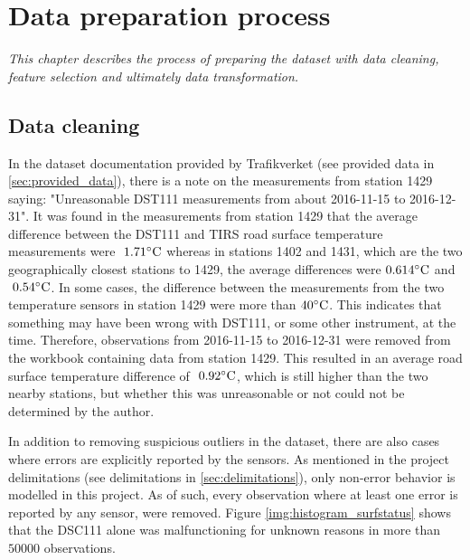 \chapter{Data preparation process}
\emph{This chapter describes the process of preparing the dataset with data cleaning, feature selection and ultimately data transformation.}


\section{Data cleaning} \label{sec:datacleaning}
	 In the dataset documentation provided by Trafikverket (see provided data in \ref{sec:provided_data}), there is a note on the measurements from station 1429 saying: "Unreasonable DST111 measurements from about 2016-11-15 to 2016-12-31". It was found in the measurements from station 1429 that the average difference between the DST111 and TIRS road surface temperature measurements were $~1.71 \celsius$ whereas in stations 1402 and 1431, which are the two geographically closest stations to 1429, the average differences were $0.614 \celsius$ and  $~0.54 \celsius$. In some cases, the difference between the measurements from the two temperature sensors in station 1429 were more than $40 \celsius$. This indicates that something may have been wrong with DST111, or some other instrument, at the time. Therefore, observations from 2016-11-15 to 2016-12-31 were removed from the workbook containing data from station 1429. This resulted in an average road surface temperature difference of $~0.92 \celsius$, which is still higher than the two nearby stations, but whether this was unreasonable or not could not be determined by the author. 

	In addition to removing suspicious outliers in the dataset, there are also cases where errors are explicitly reported by the sensors. As mentioned in the project delimitations (see delimitations in \ref{sec:delimitations}), only non-error behavior is modelled in this project. As of such, every observation where at least one error is reported by any sensor, were removed. Figure \ref{img:histogram_surfstatus} shows that the DSC111 alone was malfunctioning for unknown reasons in more than $50 000$ observations. 

